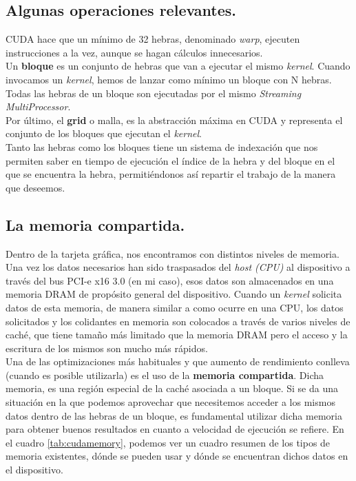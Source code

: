 \subsection{Algunas operaciones relevantes.}

CUDA hace que un mínimo de 32 hebras, denominado \textit{warp}, ejecuten instrucciones a la vez, aunque se hagan cálculos innecesarios.\\

Un \textbf{bloque} es un conjunto de hebras que van a ejecutar el mismo \textit{kernel}. Cuando invocamos un \textit{kernel}, hemos de lanzar como mínimo un bloque con N hebras. Todas las hebras de un bloque son ejecutadas por el mismo \textit{Streaming MultiProcessor}.\\

Por último, el \textbf{grid} o malla, es la abstracción máxima en CUDA y representa el conjunto de los bloques que ejecutan el \textit{kernel}. \\

Tanto las hebras como los bloques tiene un sistema de indexación que nos permiten saber en tiempo de ejecución el índice de la hebra y del bloque en el que se encuentra la hebra, permitiéndonos así repartir el trabajo de la manera que deseemos.

\subsection{La memoria compartida.}
Dentro de la tarjeta gráfica, nos encontramos con distintos niveles de memoria. Una vez los datos necesarios han sido traspasados del \textit{host (CPU)} al dispositivo a través del bus PCI-e x16 3.0 (en mi caso), esos datos son almacenados en una memoria DRAM de propósito general del dispositivo. Cuando un \textit{kernel} solicita datos de esta memoria, de manera similar a como ocurre en una CPU, los datos solicitados y los colidantes en memoria son colocados a través de varios niveles de caché, que tiene tamaño más limitado que la memoria DRAM pero el acceso y la escritura de los mismos son mucho más rápidos.\\

Una de las optimizaciones más habituales y que aumento de rendimiento conlleva (cuando es posible utilizarla) es el uso de la \textbf{memoria compartida}. Dicha memoria, es una región especial de la caché asociada a un bloque. Si se da una situación en la que podemos aprovechar que necesitemos acceder a los mismos datos dentro de las hebras de un bloque, es fundamental utilizar dicha memoria para obtener buenos resultados en cuanto a velocidad de ejecución se refiere. En el cuadro \ref{tab:cudamemory}, podemos ver un cuadro resumen de los tipos de memoria existentes, dónde se pueden usar y dónde se encuentran dichos datos en el dispositivo.

